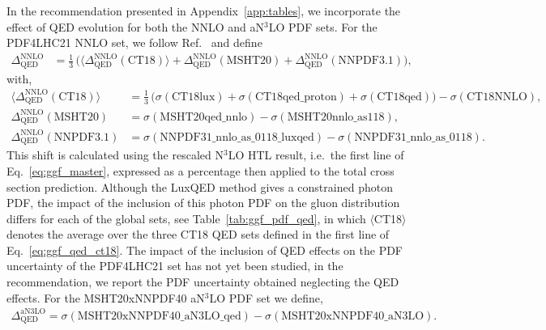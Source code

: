 
In the recommendation presented in Appendix~\ref{app:tables}, we incorporate the effect of QED evolution for both the NNLO and aN$^3$LO PDF sets.
For the PDF4LHC21 NNLO set, we follow Ref.~\cite{Cooper-Sarkar:2025sqw} and define
\begin{align}
\Delta^\text{NNLO}_\text{QED} &=
    \frac{1}{3}\,\bigl(
    \langle \Delta^\text{NNLO}_\text{QED}(\text{CT18}) \rangle + 
    \Delta^\text{NNLO}_\text{QED}(\text{MSHT20}) + 
    \Delta^\text{NNLO}_\text{QED}(\text{NNPDF3.1})
    \bigr),
\label{eq:ggf_qed}
\end{align}
with,
\begin{align}
    \langle \Delta^\text{NNLO}_\text{QED}(\text{CT18}) \rangle &=
    \frac{1}{3}\,\bigl(
    \sigma(\text{CT18lux}) +
    \sigma(\text{CT18qed\_proton}) +
    \sigma(\text{CT18qed})
    \bigr)
    - \sigma(\text{CT18NNLO})
    , \nonumber \\
    \Delta^\text{NNLO}_\text{QED}(\text{MSHT20}) &=
    \sigma(\text{MSHT20qed\_nnlo}) - \sigma(\text{MSHT20nnlo\_as118})
    , \nonumber \\
    \Delta^\text{NNLO}_\text{QED}(\text{NNPDF3.1}) &=
    \sigma(\text{NNPDF31\_nnlo\_as\_0118\_luxqed}) - \sigma(\text{NNPDF31\_nnlo\_as\_0118}).
\label{eq:ggf_qed_ct18}
\end{align}
This shift is calculated using the rescaled N$^3$LO HTL result, i.e.\ the first line of Eq.~\eqref{eq:ggf_master}, expressed as a percentage then applied to the total cross section prediction.
Although the LuxQED method gives a constrained photon PDF, the impact of the inclusion of this photon PDF on the gluon distribution differs for each of the global sets, see Table~\ref{tab:ggf_pdf_qed}, in which $\langle$CT18$\rangle$ denotes the average over the three CT18 QED sets defined in the first line of Eq.~\eqref{eq:ggf_qed_ct18}.
The impact of the inclusion of QED effects on the PDF uncertainty of the PDF4LHC21 set has not yet been studied, in the recommendation, we report the PDF uncertainty obtained neglecting the QED effects.
For the MSHT20xNNPDF40 aN$^3$LO PDF set we define,
\begin{align}
\Delta^{\text{aN3LO}}_\text{QED} = \sigma(\text{MSHT20xNNPDF40\_aN3LO\_qed}) - \sigma(\text{MSHT20xNNPDF40\_aN3LO}).
\end{align}

